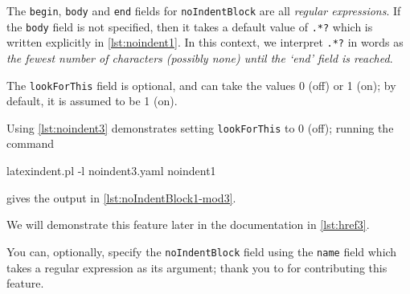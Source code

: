  The \texttt{begin}, \texttt{body} and \texttt{end} fields for \texttt{noIndentBlock} are
 all \emph{regular expressions}. If the \texttt{body} field is not specified, then it
 takes a default value of \lstinline!.*?! which is written explicitly in
 \cref{lst:noindent1}. In this context, we interpret \lstinline!.*?! in words as
 \emph{the fewest number of characters (possibly none) until the `end' field is reached}.

 The \texttt{lookForThis} field is optional, and can take the values 0 (off) or 1 (on);
 by default, it is assumed to be 1 (on).

 \begin{example}
 Using \cref{lst:noindent3} demonstrates setting \texttt{lookForThis} to 0 (off); running
 the command

 \begin{commandshell}
latexindent.pl -l noindent3.yaml noindent1
\end{commandshell}

 gives the output in \cref{lst:noIndentBlock1-mod3}.


 \end{example}

 We will demonstrate this feature later in the documentation in \cref{lst:href3}.

 You can, optionally, specify  the
 \texttt{noIndentBlock} field using the \texttt{name} field which takes a regular
 expression as its argument; thank you to \cite{XuehaiPan} for contributing this feature.

